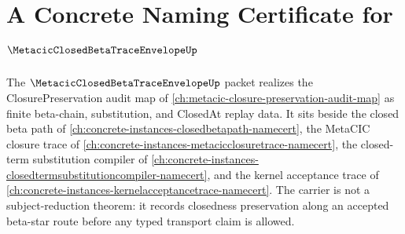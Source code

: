 \chapter{A Concrete Naming Certificate for $\MetacicClosedBetaTraceEnvelopeUp$}
\label{ch:concrete-instances-metacic-closed-beta-trace-envelope-namecert}

The $\MetacicClosedBetaTraceEnvelopeUp$ packet realizes the ClosurePreservation audit map of \autoref{ch:metacic-closure-preservation-audit-map} as finite beta-chain, substitution, and ClosedAt replay data. It sits beside the closed beta path of \autoref{ch:concrete-instances-closedbetapath-namecert}, the MetaCIC closure trace of \autoref{ch:concrete-instances-metacicclosuretrace-namecert}, the closed-term substitution compiler of \autoref{ch:concrete-instances-closedtermsubstitutioncompiler-namecert}, and the kernel acceptance trace of \autoref{ch:concrete-instances-kernelacceptancetrace-namecert}. The carrier is not a subject-reduction theorem: it records closedness preservation along an accepted beta-star route before any typed transport claim is allowed.

